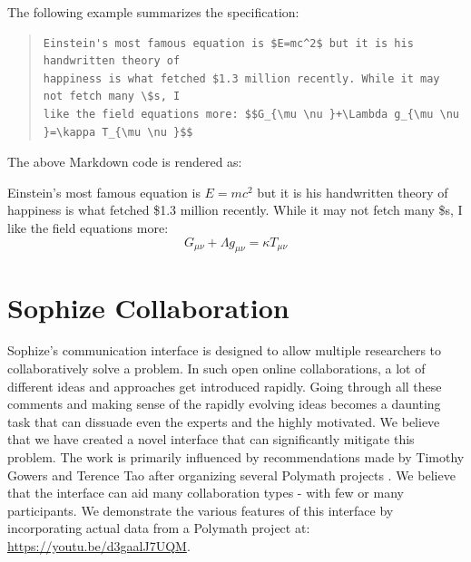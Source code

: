 \documentclass[a4paper]{article}
\begin{document}
The following example summarizes the specification:
\begin{quote}
\begin{verbatim} 
Einstein's most famous equation is $E=mc^2$ but it is his handwritten theory of 
happiness is what fetched $1.3 million recently. While it may not fetch many \$s, I 
like the field equations more: $$G_{\mu \nu }+\Lambda g_{\mu \nu }=\kappa T_{\mu \nu }$$
\end{verbatim}
\end{quote}


The above Markdown code is rendered as:
\begin{mdframed}
Einstein's most famous equation is $E=mc^2$ but it is his handwritten theory of happiness is
what fetched \$1.3 million recently. While it may not fetch many \$s, I like the field
equations more: $$G_{\mu \nu }+\Lambda g_{\mu \nu }=\kappa T_{\mu \nu }$$
\end{mdframed}

\section{Sophize Collaboration}

Sophize's communication interface is designed to allow multiple researchers to collaboratively solve a problem. In such open online collaborations, a lot of different ideas and approaches get introduced rapidly. Going through all these comments and making sense of the rapidly evolving ideas becomes a daunting task that can dissuade even the experts and the highly motivated. We believe that we have created a novel interface that can significantly mitigate this problem. The work is primarily influenced by recommendations made by Timothy Gowers and Terence Tao after organizing several Polymath projects \cite{polymath_blog}. We believe that the interface can aid many collaboration types - with few or many participants. We demonstrate the various features of this interface by incorporating actual data from a Polymath project at: \url{https://youtu.be/d3gaalJ7UQM}.
\end{document}
